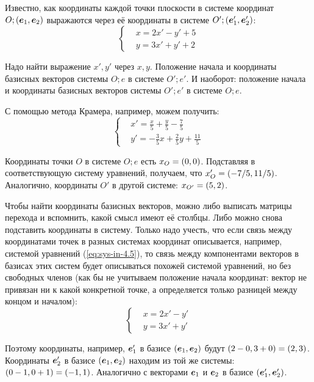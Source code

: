 \documentclass[a4paper,12pt]{article}
\begin{document}
  
  \begin{problem}[4.5]
    Известно, как координаты каждой точки плоскости в системе координат $O; (\boldsymbol e_1, \boldsymbol e_2)$ выражаются через её координаты в системе $O'; (\boldsymbol e_1', \boldsymbol e_2')$:
    \begin{equation}\label{eq:sys-in-4.5}
      \left\{
        \begin{aligned}
          &x = 2x' - y' + 5\\
          &y = 3x' + y' + 2
        \end{aligned}
      \right.
    \end{equation}
    
    Надо найти выражение $x', y'$ через $x, y$.
    Положение начала и координаты базисных векторов системы $O; e$ в системе $O'; e'$.
    И наоборот: положение начала и координаты базисных векторов системы $O'; e'$ в системе $O; e$.
  \end{problem}
  
  \begin{solution}
    С помощью метода Крамера, например, можем получить:
    \[
      \left\{
        \begin{aligned}
          &x' = \frac{x}{5} + \frac{y}{5} - \frac{7}{5}\\
          &y' = -\frac{3}{5}x + \frac{2}{5}y + \frac{11}{5}
        \end{aligned}
      \right.
    \]
    
    Координаты точки $O$ в системе $O; e$ есть $x_O \hm= (0, 0)$.
    Подставляя в соответствующую систему уравнений, получаем, что $x'_O \hm= (-7/5, 11/5)$.
    Аналогично, координаты $O'$ в другой системе: $x_{O'} \hm= (5, 2)$.
    
    Чтобы найти координаты базисных векторов, можно либо выписать матрицы перехода и вспомнить, какой смысл имеют её столбцы.
    Либо можно снова подставить координаты в систему.
    Только надо учесть, что если связь между координатами точек в разных системах координат описывается, например, системой уравнений (\ref{eq:sys-in-4.5}), то связь между компонентами векторов в базисах этих систем будет описываться похожей системой уравнений, но без свободных членов (как бы не учитываем положение начала координат: вектор не привязан ни к какой конкретной точке, а определяется только разницей между концом и началом):
    \[
      \left\{
        \begin{aligned}
          &x = 2x' - y'\\
          &y = 3x' + y'
        \end{aligned}
      \right.
    \]
    
    Поэтому координаты, например, $\boldsymbol e_1'$ в базисе $(\boldsymbol e_1, \boldsymbol e_2)$ будут $(2 \hm- 0, 3 \hm+ 0) \hm= (2, 3)$.
    Координаты $\boldsymbol e_2'$ в базисе $(\boldsymbol e_1, \boldsymbol e_2)$ находим из той же системы: $(0 \hm- 1, 0 \hm+ 1) \hm= (-1, 1)$.
    Аналогично с векторами $\boldsymbol e_1$ и $\boldsymbol e_2$ в базисе $(\boldsymbol e_1', \boldsymbol e_2')$.
  \end{solution}
\end{document}
